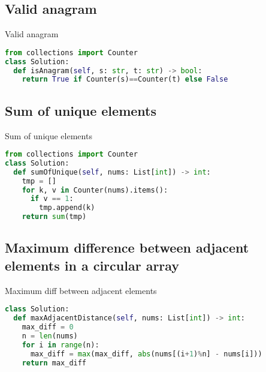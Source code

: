 \documentclass[a4paper,12pt]{article}
\begin{document}
\begin{multicols}{2}
\subsection{Valid anagram}

\begin{mycode}[label={lst:valid-anagram}]{Valid anagram}
\begin{lstlisting}[language=Python]
from collections import Counter
class Solution:
  def isAnagram(self, s: str, t: str) -> bool:
    return True if Counter(s)==Counter(t) else False
\end{lstlisting}
\end{mycode}

\subsection{Sum of unique elements}

\begin{mycode}[label={lst:sum-of-unique-elements}]{Sum of unique elements}
\begin{lstlisting}[language=Python]
from collections import Counter
class Solution:
  def sumOfUnique(self, nums: List[int]) -> int:
    tmp = []
    for k, v in Counter(nums).items():
      if v == 1:
        tmp.append(k)
    return sum(tmp)
\end{lstlisting}
\end{mycode}

\subsection{Maximum difference between adjacent elements in a circular array}
\begin{mycode}[label={lst:max-diff-between-adjacent-elements-circular-array}]{Maximum diff between adjacent elements}
\begin{lstlisting}[language=Python]
class Solution:
  def maxAdjacentDistance(self, nums: List[int]) -> int:
    max_diff = 0
    n = len(nums)
    for i in range(n):
      max_diff = max(max_diff, abs(nums[(i+1)%n] - nums[i]))
    return max_diff
\end{lstlisting}
\end{mycode}


\end{multicols}
\end{document}
